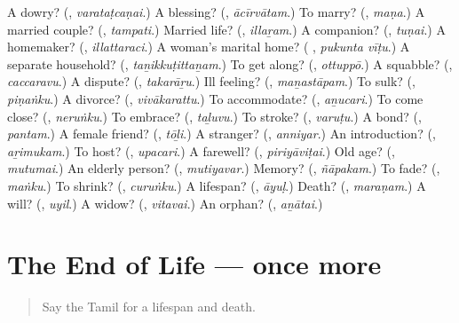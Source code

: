\begin{tcolorbox}[breakable,colback=teal!4,colframe=teal!35!black,title={Before you move on}]
A dowry? (\textbf{}, \emph{varataṭcaṇai}.) A blessing? (\textbf{}, \emph{ācīrvātam}.) To marry? (\textbf{}, \emph{maṇa}.) A married couple? (\textbf{}, \emph{tampati}.) Married life? (\textbf{}, \emph{illaṟam}.) A companion? (\textbf{}, \emph{tuṇai}.) A homemaker? (\textbf{}, \emph{illattaraci}.) A woman’s marital home? (\textbf{ }, \emph{pukunta vīṭu}.) A separate household? (\textbf{}, \emph{taṉikkuṭittaṉam}.) To get along? (\textbf{}, \emph{ottuppō}.) A squabble? (\textbf{}, \emph{caccaravu}.) A dispute? (\textbf{}, \emph{takarāṟu}.) Ill feeling? (\textbf{}, \emph{maṉastāpam}.) To sulk? (\textbf{}, \emph{piṇaṅku}.) A divorce? (\textbf{}, \emph{vivākarattu}.) To accommodate? (\textbf{}, \emph{aṉucari}.) To come close? (\textbf{}, \emph{neruṅku}.) To embrace? (\textbf{}, \emph{taḻuvu}.) To stroke? (\textbf{}, \emph{varuṭu}.) A bond? (\textbf{}, \emph{pantam}.) A female friend? (\textbf{}, \emph{tōḻi}.) A stranger? (\textbf{}, \emph{anniyar}.) An introduction? (\textbf{}, \emph{aṟimukam}.) To host? (\textbf{}, \emph{upacari}.) A farewell? (\textbf{}, \emph{piriyāviṭai}.) Old age? (\textbf{}, \emph{mutumai}.) An elderly person? (\textbf{}, \emph{mutiyavar}.) Memory? (\textbf{}, \emph{ñāpakam}.) To fade? (\textbf{}, \emph{maṅku}.) To shrink? (\textbf{}, \emph{curuṅku}.) A lifespan? (\textbf{}, \emph{āyuḷ}.) Death? (\textbf{}, \emph{maraṇam}.) A will? (\textbf{}, \emph{uyil}.) A widow? (\textbf{}, \emph{vitavai}.) An orphan? (\textbf{}, \emph{aṉātai}.)
\end{tcolorbox}
\section[(dialogue)]{The End of Life — once more}

\label{lesson:TA-R505-review-final-505}



\begin{quote}
Say the Tamil for a lifespan and death.
\end{quote}

